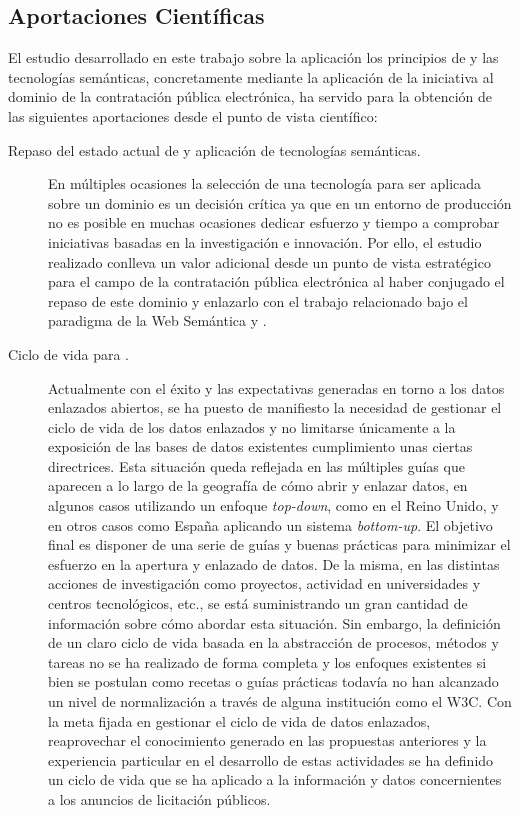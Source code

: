 \subsection{Aportaciones Científicas}
El estudio desarrollado en este trabajo sobre la aplicación los principios de \opendata y las tecnologías semánticas, concretamente 
mediante la aplicación de la iniciativa \linkeddata al dominio de la contratación pública electrónica, ha servido para la obtención 
de las siguientes aportaciones desde el punto de vista científico:
\begin{description}
 \item [Repaso del estado actual de \eproc y aplicación de tecnologías semánticas.] En múltiples ocasiones la selección de una tecnología 
para ser aplicada sobre un dominio es un decisión crítica ya que en un entorno de producción no es posible en muchas ocasiones dedicar 
esfuerzo y tiempo a comprobar iniciativas basadas en la investigación e innovación. Por ello, el estudio realizado conlleva un valor 
adicional desde un punto de vista estratégico para el campo de la contratación pública electrónica al haber conjugado el repaso 
de este dominio y enlazarlo con el trabajo relacionado bajo el paradigma de la Web Semántica y \linkeddata. 

\item [Ciclo de vida para \linkeddata.] Actualmente con el éxito y las expectativas generadas en torno a los datos enlazados abiertos, se ha 
puesto de manifiesto la necesidad de gestionar el ciclo de vida de los datos enlazados y no limitarse únicamente a la exposición de 
las bases de datos existentes cumplimiento unas ciertas directrices. Esta situación queda reflejada en las múltiples guías que aparecen 
a lo largo de la geografía de cómo abrir y enlazar datos, en algunos casos utilizando un enfoque \textit{top-down}, como en el Reino 
Unido, y en otros casos como España aplicando un sistema \textit{bottom-up}. El objetivo final es disponer de una serie de guías 
y buenas prácticas para minimizar el esfuerzo en la apertura y enlazado de datos. De la misma, en las distintas acciones de 
investigación como proyectos, actividad en universidades y centros tecnológicos, etc., se está suministrando un gran cantidad de información 
sobre cómo abordar esta situación. Sin embargo, la definición de un claro ciclo de vida basada en la abstracción de procesos, métodos 
y tareas no se ha realizado de forma completa y los enfoques existentes si bien se postulan como recetas o guías prácticas todavía 
no han alcanzado un nivel de normalización a través de alguna institución como el \gls{W3C}. Con la meta fijada en gestionar el ciclo de vida 
de datos enlazados, reaprovechar el conocimiento generado en las propuestas anteriores y la experiencia particular en el desarrollo 
de estas actividades se ha definido un ciclo de vida que se ha aplicado a la información y datos concernientes a los anuncios 
de licitación públicos.


\end{description}
